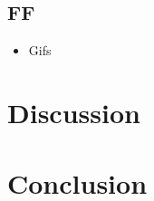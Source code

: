 \documentclass[%
 reprint,
 amsmath,amssymb,
 aps,
]{revtex4-2}
\begin{document}
\subsection{FF}
\begin{itemize}
\item Gifs
\end{itemize}

\section{Discussion}

\section{Conclusion}

\end{document}
